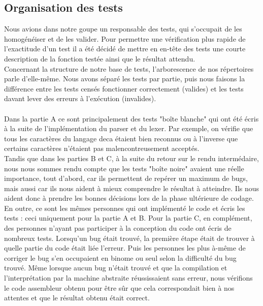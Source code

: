\documentclass{article}
\begin{document}
\subsection{Organisation des tests}
Nous avions dans notre goupe un responsable des tests, qui s'occupait de les homogénéiser et de les valider. Pour permettre une vérification plus rapide de l'exactitude d'un test il a été décidé de mettre en en-tête des
tests une courte description de la fonction testée ainsi que le résultat attendu.\newline
\\
Concernant la structure de notre base de tests, l'arborescence de nos répertoires parle d'elle-même. Nous avons séparé les
tests par partie, puis nous faisons la différence entre les tests censés fonctionner correctement (valides) et les tests davant lever des erreurs à l'exécution (invalides).
\\\\
Dans la partie A ce sont principalement des tests "boîte blanche" qui ont été écris à la suite de l'implémentation du parser et du lexer. Par exemple, on vérifie que tous les caractères du langage deca étaient bien reconnus
 ou à l'inverse que certains caractères n'étaient pas malencontreusement acceptés.
\\
Tandis que dans les parties B et C, à la suite du retour sur le rendu intermédaire,
nous nous sommes rendu compte que les tests "boîte noire" avaient une réelle importance, tout d'abord, car ils permettent de
repérer un maximum de bugs, mais aussi car ils nous aident à mieux comprendre le résultat à atteindre.
Ils nous aident donc à prendre les bonnes décisions lors de la phase ultérieure de codage. \newline
\\
En outre, ce sont les mêmes personnes qui ont implémenté le code et écris les tests : ceci uniquement pour la partie A et B. \newline
Pour la partie C, en complément, des personnes
n'ayant pas participer à la conception du code ont écris de nombreux tests. Lorsqu'un bug était trouvé, la première étape était de trouver à quelle partie du code était liée l'erreur. Puis les personnes les plus à-même
de corriger le bug s'en occupaient en binome ou seul selon la difficulté du bug trouvé. Même lorsque aucun bug n'était trouvé et que la compilation et
l'interprétation par la machine
abstraite réussissaient sans erreur, nous vérifions le code assembleur obtenu pour être sûr que cela correspondait bien à nos attentes et que le résultat obtenu était correct.
\end{document}

